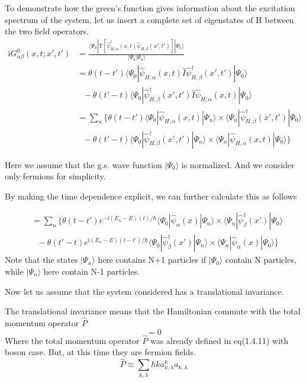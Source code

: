 To demonstrate how the green's function gives information about the excitation spectrum of the system, let us insert a complete set of eigenstates of H between the two field operators.
\begin{align}\label{2.3.7}
\mathrm{i}G^0_{\alpha\beta}(x,t;x',t')&=\frac{\langle\Psi_0|\mathrm{T}[\hat \psi^{
\dagger}_{H,\alpha}(x,t)\hat \psi_{H,\beta} (x',t')]|\Psi_0\rangle}{\langle\Psi_0|\Psi_0\rangle} \nonumber \\
&=\theta(t-t')\langle\Psi_0|\hat \psi_{H,\alpha}(x,t)\hat{I}\hat \psi^{
\dagger}_{H,\beta} (x',t')|\Psi_0\rangle \nonumber \\
& \ \ \ -\theta(t'-t)\langle\Psi_0|\hat \psi^{
\dagger}_{H,\beta}(x',t')\hat{I}\hat \psi_{H,\alpha} (x,t)|\Psi_0\rangle \nonumber \\
&=\sum_n\{\theta(t-t')\langle\Psi_0|\hat \psi_{H,\alpha}(x,t)|\Psi_n\rangle\times\langle\Psi_n|\hat \psi^{
\dagger}_{H,\beta} (x',t')|\Psi_0\rangle \nonumber \\
& \ \ \ -\theta(t'-t)\langle\Psi_0|\hat \psi^{
\dagger}_{H,\beta}(x',t')|\Psi_n\rangle\times\langle\Psi_n|\hat \psi_{H,\alpha} (x,t)|\Psi_0\rangle\}
\end{align}

Here we assume that the g.s. wave function $|\Psi_0\rangle$ is normalized. And we consider only fermions for simplicity.

By making the time dependence explicit, we can further calculate this as follows

\begin{align}
&=\sum_n\{\theta(t-t')e^{-\mathrm{i}(E_n-E)(t)/\hbar}\langle\Psi_0|\hat \psi_{\alpha}(x)|\Psi_n\rangle\times\langle\Psi_n|\hat \psi^{
\dagger}_{\beta} (x')|\Psi_0\rangle \nonumber \\
& \ \ \ -\theta(t'-t)e^{\mathrm{i}(E_n-E)(t-t')/\hbar}\langle\Psi_0|\hat \psi^{
\dagger}_{\beta}(x')|\Psi_n\rangle\times\langle\Psi_n|\hat \psi_{\alpha} (x)|\Psi_0\rangle\} \nonumber
\end{align}
Note that the states $|\Psi_n\rangle$ here contains N+1 particles if $|\Psi_0\rangle$ contain N particles, while $|\Psi_n\rangle$ here contain N-1 particles.

Now let us assume that the system considered has a translational invariance.

The translational invariance means that the Hamiltonian commute with the total momentum operator $\hat{P}$
\begin{equation}
[\hat{H},\hat{P}]=0\label{2.3.8}
\end{equation}
Where the total momentum operator $\hat{P}$ was already defined in eq(1.4.11) with boson case. But, at this time they are fermion fields.
\begin{equation}
\hat{P}\equiv \sum_{k,\lambda} \hbar k a^k_{k,\lambda} a_{k,\lambda} \nonumber
\end{equation}

